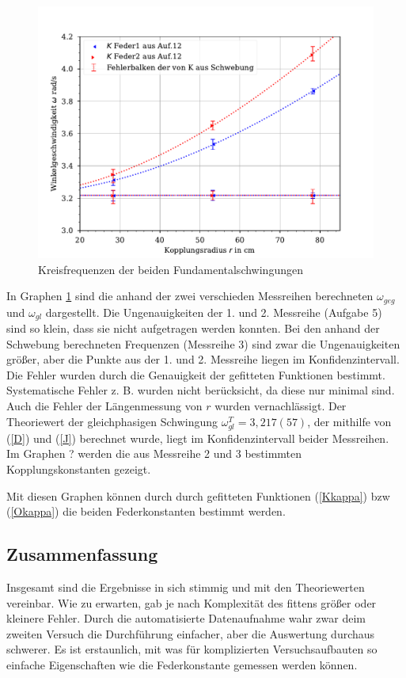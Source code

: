 \documentclass[11pt, a4paper]{article}
\begin{document}
    \begin{figure}[!h]
        \centering
        \includegraphics[width=\textwidth]{./plotW.pdf}

        \caption{Kreisfrequenzen der beiden Fundamentalschwingungen}
        \label{fig:plotW}
    \end{figure}

    In Graphen \ref{fig:plotW} sind die anhand der zwei verschieden Messreihen
    berechneten $\omega_{geg}$ und $\omega_{gl}$ dargestellt. Die Ungenauigkeiten der 1. und 2. Messreihe (Aufgabe 5) sind so klein,
    dass sie nicht aufgetragen werden konnten. Bei den anhand der Schwebung berechneten Frequenzen (Messreihe 3)
    sind zwar die Ungenauigkeiten größer, aber die Punkte aus der 1. und 2. Messreihe liegen im Konfidenzintervall.
    Die Fehler wurden durch die Genauigkeit der gefitteten Funktionen bestimmt. Systematische Fehler z. B. wurden
    nicht berücksicht, da diese nur minimal sind. Auch die Fehler der Längenmessung von $r$ wurden vernachlässigt.
    Der Theoriewert der gleichphasigen Schwingung $\omega_{gl}^T = 3,217(57)$,
    der mithilfe von (\ref{D}) und (\ref{J}) berechnet wurde,
    liegt im Konfidenzintervall beider Messreihen. \\
    
    Im Graphen ? werden die aus Messreihe 2 und 3 bestimmten Kopplungskonstanten gezeigt.

    Mit diesen Graphen können durch durch gefitteten Funktionen (\ref{Kkappa}) bzw (\ref{Okappa}) die beiden
    Federkonstanten bestimmt werden.

    \subsection{Zusammenfassung}
    Insgesamt sind die Ergebnisse in sich stimmig und mit den Theoriewerten vereinbar. Wie zu erwarten, gab
    je nach Komplexität des fittens größer oder kleinere Fehler. Durch die automatisierte Datenaufnahme
    wahr zwar deim zweiten Versuch die Durchführung einfacher, aber die Auswertung durchaus schwerer.
    Es ist erstaunlich, mit was für komplizierten
    Versuchsaufbauten so einfache Eigenschaften wie die Federkonstante gemessen werden können.
\end{document}
